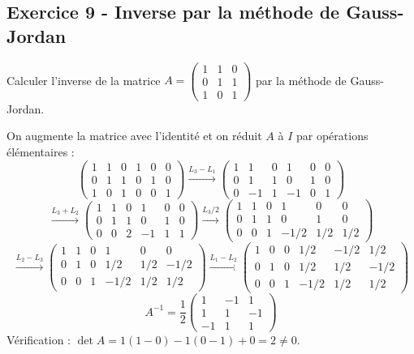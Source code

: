 \documentclass[12pt,a4paper]{article}
\begin{document}
\subsection*{Exercice 9 - Inverse par la méthode de Gauss-Jordan \niveau{\moyen}}

\begin{boiteexercice}
Calculer l'inverse de la matrice $A = \begin{pmatrix}1&1&0\\0&1&1\\1&0&1\end{pmatrix}$ par la méthode de Gauss-Jordan.
\end{boiteexercice}

\begin{boitecorrige}
On augmente la matrice avec l'identité et on réduit $A$ à $I$ par opérations élémentaires :
\[
\left(\begin{array}{ccc|ccc}1&1&0&1&0&0\\0&1&1&0&1&0\\1&0&1&0&0&1\end{array}\right)
\xrightarrow{L_3-L_1}
\left(\begin{array}{ccc|ccc}1&1&0&1&0&0\\0&1&1&0&1&0\\0&-1&1&-1&0&1\end{array}\right)
\]
\[
\xrightarrow{L_3+L_2}
\left(\begin{array}{ccc|ccc}1&1&0&1&0&0\\0&1&1&0&1&0\\0&0&2&-1&1&1\end{array}\right)
\xrightarrow{L_3/2}
\left(\begin{array}{ccc|ccc}1&1&0&1&0&0\\0&1&1&0&1&0\\0&0&1&-1/2&1/2&1/2\end{array}\right)
\]
\[
\xrightarrow{L_2-L_3}
\left(\begin{array}{ccc|ccc}1&1&0&1&0&0\\0&1&0&1/2&1/2&-1/2\\0&0&1&-1/2&1/2&1/2\end{array}\right)
\xrightarrow{L_1-L_2}
\left(\begin{array}{ccc|ccc}1&0&0&1/2&-1/2&1/2\\0&1&0&1/2&1/2&-1/2\\0&0&1&-1/2&1/2&1/2\end{array}\right)
\]
\[
A^{-1} = \frac{1}{2}\begin{pmatrix}1&-1&1\\1&1&-1\\-1&1&1\end{pmatrix}
\]
Vérification : $\det A = 1(1-0) - 1(0-1) + 0 = 2 \neq 0$.
\end{boitecorrige}
\end{document}
